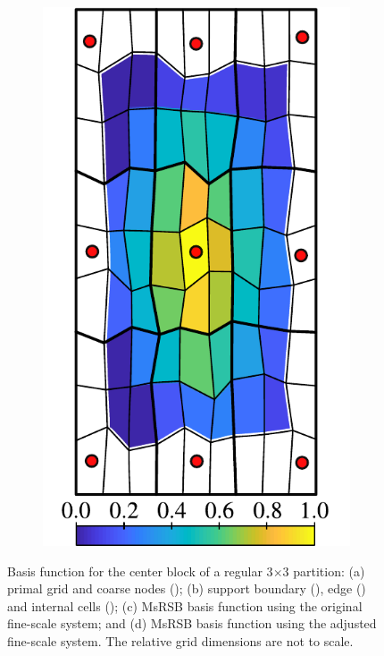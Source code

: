 \begin{figure} [htbp]
\begin{subfigure}[t]{0.22\textwidth}
  \centerline{\includegraphics[width=\linewidth]{figs/MsRSB/MPFA_9x9_d}}
  \caption{\label{fig:mpfa_demo_alter}}
\end{subfigure}
\caption[MsRSB basis functions for MPFA flow problem]{\label{fig:mpfa_demo} Basis function for the center block of a regular 3$\times$3 partition: (a) primal grid and coarse nodes (); (b) support boundary (), edge () and internal cells (); (c) MsRSB basis function using the original fine-scale system; and (d) MsRSB basis function using the adjusted fine-scale system. The relative grid dimensions are not to scale.}
\end{figure}

